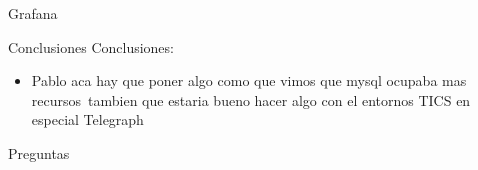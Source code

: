 \documentclass[aspectratio= 43]{beamer}
\begin{document}
\begin{frame}{Grafana}
\end{frame}


\begin{frame}{Conclusiones}
       Conclusiones:
        \begin{itemize}
            \item {Pablo aca hay que poner algo como que vimos que mysql ocupaba mas recursos\
            tambien que estaria bueno hacer algo con el entornos TICS en especial Telegraph }
        \end{itemize}
  \end{frame}


  \begin{frame}{Preguntas}
  \end{frame}
\end{document}
